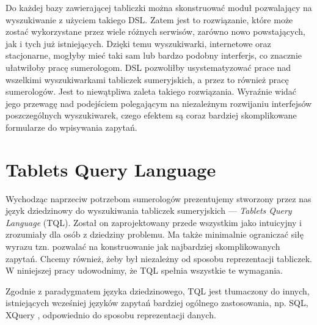 Do każdej bazy zawierającej tabliczki można skonstruować moduł pozwalający na wyszukiwanie z użyciem takiego DSL.
Zatem jest to rozwiązanie, które może zostać wykorzystane przez wiele różnych serwisów, zarówno nowo powstających, jak i tych już 
istniejących. Dzięki temu wyszukiwarki, internetowe oraz stacjonarne, mogłyby mieć taki sam lub bardzo podobny interferjs, co znacznie 
ułatwiłoby pracę sumerologom. DSL pozwoliłby usystematyzować prace nad wszelkimi wyszukiwarkami tabliczek sumeryjskich, a przez to również 
pracę sumerologów. Jest to niewątpliwa zaleta takiego rozwiązania. Wyraźnie widać jego przewagę nad podejściem polegającym na niezależnym 
rozwijaniu interfejsów poszczególnych wyszukiwarek, czego efektem są coraz bardziej skomplikowane formularze do wpisywania zapytań.


\section*{Tablets Query Language}

Wychodząc naprzeciw potrzebom sumerologów prezentujemy stworzony przez nas język dziedzinowy do wyszukiwania tabliczek sumeryjskich --- 
\textit{Tablets Query Language} (TQL). Został on zaprojektowany przede wszystkim jako intuicyjny i zrozumiały dla osób z dziedziny problemu.
 Ma także minimalnie ograniczać siłę wyrazu tzn. pozwalać na konstruowanie jak najbardziej skomplikowanych zapytań. Chcemy również, żeby 
był niezależny od sposobu reprezentacji tabliczek. W niniejszej pracy udowodnimy, że TQL spełnia wszystkie te wymagania. 

Zgodnie z paradygmatem języka dziedzinowego, TQL jest tłumaczony do innych, istniejących wcześniej języków zapytań bardziej 
ogólnego zastosowania, np. SQL, XQuery \cite{xquery}, odpowiednio do sposobu reprezentacji danych.


